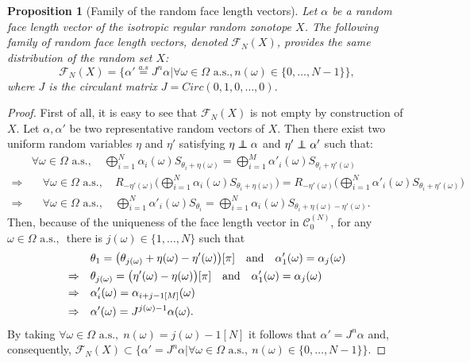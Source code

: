 \documentclass[numbers,compress,v1.0.1]{vmsta}
\newcommand\independent{\protect\mathpalette{\protect\independenT}{\perp}}
\def\independenT#1#2{\mathrel{\rlap{$#1#2$}\mkern2mu{#1#2}}}
\newtheorem{proposition}{Proposition}
\theoremstyle{definition}
\begin{document}
\begin{proposition}[Family of the random face length vectors]
Let $\alpha$ be a random face length vector of the isotropic regular
random zonotope $X$. The following family of random face length
vectors, denoted $\mathcal{F}_{N}(X)$, provides the same distribution
of the random set $X$:
%
\begin{equation}
\mathcal{F}_{N}(X)=\bigl\lbrace\alpha'\overset{a.s}
{=}J^n\alpha\big\vert\forall \omega\in\varOmega\text{ a.s.}, n(\omega)\in
\lbrace0,\dots,N-1\rbrace \bigr\rbrace,
\end{equation}
%
where $J$ is the circulant matrix $J=Circ(0,1,0,\dots,0)$.
\end{proposition}

\begin{proof}
First of all, it is easy to see that $\mathcal{F}_{N}(X)$ is not empty
by construction of $X$.
Let $\alpha,\alpha'$ be two representative random vectors of $X$. Then
there exist two uniform random variables $\eta$ and $\eta'$ satisfying
$\eta\independent\alpha$ and $\eta'\independent\alpha'$ such that:
%
\begin{align*}
&\forall\omega\in\varOmega\text{ a.s.},\quad \bigoplus_{i=1}^N
\alpha_i(\omega ) S_{\theta_i+\eta(\omega)}=\bigoplus
_{i=1}^M \alpha'_i(\omega)
S_{\theta_i+\eta'(\omega)}
\\
\Rightarrow&\quad \forall\omega\in\varOmega\text{ a.s.},\quad  R_{-\eta'(\omega
)}\Biggl(
\bigoplus_{i=1}^N \alpha_i(
\omega) S_{\theta_i+\eta(\omega
)}\Biggr)=R_{-\eta'(\omega)}\Biggl(\bigoplus
_{i=1}^N \alpha'_i(\omega)
S_{\theta
_i+\eta'(\omega)}\Biggr)
\\
\Rightarrow&\quad \forall\omega\in\varOmega\text{ a.s.},\quad \bigoplus
_{i=1}^N \alpha'_i(\omega)
S_{\theta_i}=\bigoplus_{i=1}^N
\alpha_i(\omega) S_{\theta_i+\eta(\omega)-\eta'(\omega)}.
\end{align*}
%
Then, because of the uniqueness of the face length vector in $\mathcal
{C}_0^{(N)}$, for any $\omega\in\varOmega\text{ a.s., }$ there is $j(\omega
)\in\lbrace1,\dots,N\rbrace$ such that
%
\begin{align*}
& \theta_1=\bigl(\theta_{j(\omega)}+ \eta(\omega)-
\eta'(\omega)\bigr)[\pi] \text{\quad and\quad } \alpha'_1(
\omega)=\alpha_j(\omega)
\\
\Rightarrow\quad & \theta_{j(\omega)}=\bigl(\eta'(\omega)-\eta(
\omega)\bigr)[\pi]\text{\quad and\quad } \alpha'_1(\omega)=
\alpha_j(\omega)
\\
\Rightarrow\quad &  \alpha'_i(\omega)=\alpha_{i+j-1[M]}(
\omega)
\\
\Rightarrow\quad & \alpha'(\omega)=J^{j(\omega)-1}\alpha(\omega).
\end{align*}
%
By taking $\forall\omega\in\varOmega\text{ a.s.},\;n(\omega)=j(\omega
)-1[N]$ it follows that $\alpha'=J^n \alpha$ and, consequently,
$\mathcal{F}_{N}(X)\subset\lbrace\alpha'=J^n\alpha\vert\forall\omega\in
\varOmega\text{ a.s.},\ n(\omega)\in\lbrace0,\dots,N-1\rbrace\rbrace$.


\end{proof}
\end{document}
